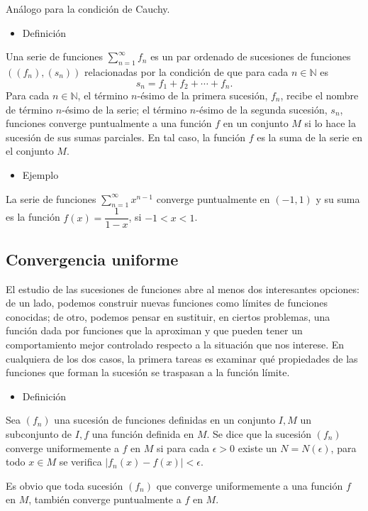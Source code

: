 Análogo para la condición de Cauchy.
\begin{itemize}[label=\color{red}\textbullet, leftmargin=*]
	\item \color{lightblue}Definición
\end{itemize}
Una serie de funciones $\sum_{n=1}^{\infty}f_n$ es un par ordenado de sucesiones de funciones $\left((f_n),(s_n)\right)$ relacionadas por la condición de que para cada $n\in\mathbb{N}$ es \[ s_n=f_1+f_2+\cdots+f_n. \] Para cada $n\in\mathbb{N}$, el término $n$-ésimo de la primera sucesión, $f_n$, recibe el nombre de término $n$-ésimo de la serie; el término $n$-ésimo de la segunda sucesión, $s_n$, funciones converge puntualmente a una función $f$ en un conjunto $M$ si lo hace la sucesión de sus sumas parciales. En tal caso, la función $f$ es la suma de la serie en el conjunto $M$.
\begin{itemize}[label=\color{red}\textbullet, leftmargin=*]
	\item \color{lightblue}Ejemplo
\end{itemize}
La serie de funciones $\sum_{n=1}^{\infty}x^{n-1}$ converge puntualmente en $(-1,1)$ y su suma es la función $f(x)=\dfrac{1}{1-x}$, si $-1<x<1$.
\subsection{Convergencia uniforme}
El estudio de las sucesiones de funciones abre al menos dos interesantes opciones: de un lado, podemos construir nuevas funciones como límites de funciones conocidas; de otro, podemos pensar en sustituir, en ciertos problemas, una función dada por funciones que la aproximan y que pueden tener un comportamiento mejor controlado respecto a la situación que nos interese. En cualquiera de los dos casos, la primera tareas es examinar qué propiedades de las funciones que forman la sucesión se traspasan a la función límite.
\begin{itemize}[label=\color{red}\textbullet, leftmargin=*]
	\item \color{lightblue}Definición
\end{itemize}
Sea $(f_n)$ una sucesión de funciones definidas en un conjunto $I,M$ un subconjunto de $I, f$ una función definida en $M$. Se dice que la sucesión $(f_n)$ converge uniformemente a $f$ en $M$ si para cada $\epsilon>0$ existe un $N=N(\epsilon)$, para todo $x\in M$ se verifica $\left|f_n(x)-f(x)\right|<\epsilon$.

Es obvio que toda sucesión $(f_n)$ que converge uniformemente a una función $f$ en $M$, también converge puntualmente a $f$ en $M$.
